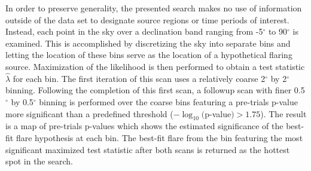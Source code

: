 \documentclass[manuscript]{aastex}
\begin{document}
In order to preserve generality, the presented search makes no use of information outside of the data set to designate source regions or time periods of interest. Instead, each point in the sky over a declination band ranging from -5$^{\circ}$ to 90$^{\circ}$ is examined. This is accomplished by discretizing the sky into separate bins and letting the location of these bins serve as the location of a hypothetical flaring source. Maximization of the likelihood is then performed to obtain a test statistic $\hat{\lambda}$ for each bin. The first iteration of this scan uses a relatively coarse 2$^{\circ}$ by 2$^{\circ}$ binning. Following the completion of this first scan, a followup scan with finer 0.5$^{\circ}$ by 0.5$^{\circ}$ binning is performed over the coarse bins featuring a pre-trials p-value more significant than a predefined threshold ($-\log_{10}($p-value$) > 1.75$). The result is a map of pre-trials p-values which shows the estimated significance of the best-fit flare hypothesis at each bin. The best-fit flare from the bin featuring the most significant maximized test statistic after both scans is returned as the hottest spot in the search.
\end{document}
